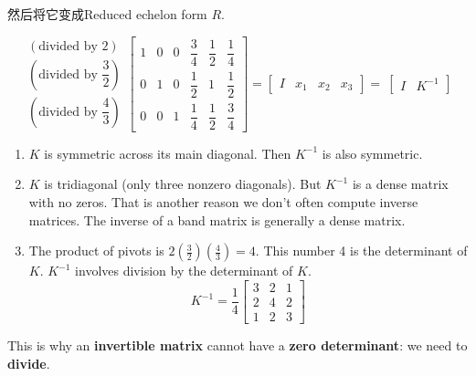 \begin{example}
    然后将它变成Reduced echelon form $R$.

   
    \begin{equation} \begin{matrix}
                (\text{divided by }2)                      \\
                \left(\text{divided by }\dfrac{3}{2}\right) \\
                \left(\text{divided by }\dfrac{4}{3}\right)
            \end{matrix}\left[\begin{matrix}
                    1 & 0 & 0 & \dfrac{3}{4} & \dfrac{1}{2} & \dfrac{1}{4} \\
                    0 & 1 & 0 & \dfrac{1}{2} & 1           & \dfrac{1}{2} \\
                    0 & 0 & 1 & \dfrac{1}{4} & \dfrac{1}{2} & \dfrac{3}{4}
                \end{matrix}\right] =\left[\begin{matrix}
                    I & x_{1} & x_{2} & x_{3}
                \end{matrix}\right] =\ \left[\begin{matrix}
                    I & K^{-1}
                \end{matrix}\right]\end{equation}
    


    \begin{enumerate}
        \item $ K $ is symmetric across its main diagonal. Then $ K^{-1} $ is also symmetric.
        \item $ K $ is tridiagonal (only three nonzero diagonals). But $ K^{-1} $ is a dense matrix with no zeros. That is another reason we don't often compute inverse matrices. The inverse of a band matrix is generally a dense matrix.
        \item The product of pivots is $ 2\left(\frac{3}{2}\right)\left(\frac{4}{3}\right)=4 $. This number 4 is the determinant of $ K $. $ K^{-1} $ involves division by the determinant of $ K $.
        \begin{equation} K^{-1}=\frac{1}{4}\left[\begin{array}{lll}3 & 2 & 1 \\ 2 & 4 & 2 \\ 1 & 2 & 3\end{array}\right] \end{equation}
    \end{enumerate}


    This is why an \textbf{invertible matrix} cannot have a \textbf{zero determinant}: we need to \textbf{divide}.

\end{example}

